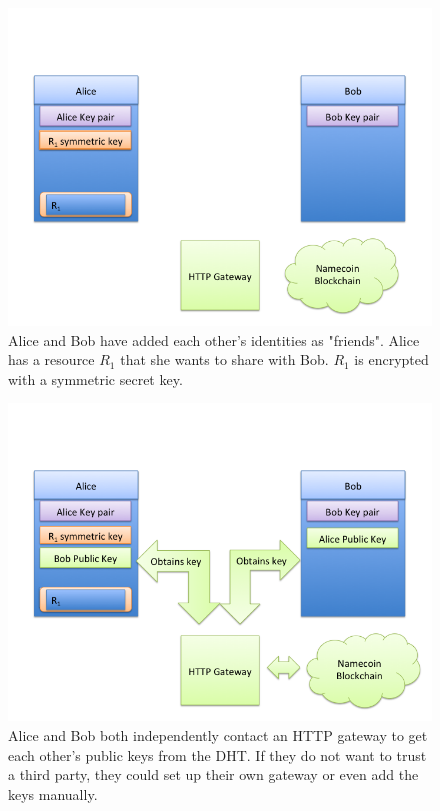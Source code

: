\begin{figure}[h]
\centering
\includegraphics[width=\textwidth,height=0.2\paperheight,keepaspectratio
]{slides/Slide1.png}
\caption{Alice and Bob have added each other's identities as "friends". Alice has a resource $R_1$ that she wants to share with Bob. $R_1$ is encrypted with a symmetric secret key.}
\label{fig:slide1}
\end{figure}
\begin{figure}[h]
\centering
\includegraphics[width=\textwidth,height=0.2\paperheight,keepaspectratio
]{slides/Slide2.png}
\caption{Alice and Bob both independently contact an HTTP gateway to get each other's public keys from the DHT. If they do not want to trust a third party, they could set up their own gateway or even add the keys manually.}
\label{fig:slide2}
\end{figure}
